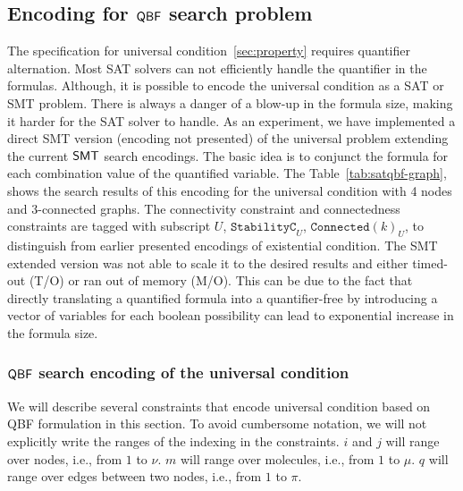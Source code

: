 \subsection{Encoding for $\mathsf{QBF}$ search problem}\label{enc:univ-cond}
%

\noindent The specification for universal condition~\ref{sec:property} requires quantifier alternation. 
%
Most SAT solvers can not efficiently handle the quantifier in the formulas. 
% 
Although, it is possible to encode the universal condition as a SAT or SMT problem.
%
There is always a danger of a blow-up in the formula size, making it harder for the SAT solver to handle. 
% 
As an experiment, we have implemented a direct SMT version (encoding not presented) of the universal problem extending the current $\mathsf{SMT}$ search encodings.
%
The basic idea is to conjunct the formula for each combination value of the quantified variable. 
%
The Table~\ref{tab:satqbf-graph}, shows the search results of this encoding for the universal condition with 4 nodes and 3-connected graphs. 
%
The connectivity constraint and connectedness constraints are tagged with subscript $U$, $\texttt{StabilityC}_{U}$, $\texttt{Connected}(k)_{U}$,  to distinguish from earlier presented encodings of existential condition.
%
The SMT extended version was not able to scale it to the desired results and either timed-out (T/O) or ran out of memory (M/O).
%
This can be due to the fact that directly translating a quantified formula into a quantifier-free by introducing a vector of variables for each boolean possibility can lead to exponential increase in the formula size.
%
%
\subsubsection{$\mathsf{QBF}$ search encoding of the universal condition}
We will describe several constraints that encode universal condition based on QBF formulation in this section.
%
To avoid cumbersome notation, we will not explicitly write the ranges
of the indexing in the constraints.
%
$i$ and $j$ will range over nodes, i.e., from $1$ to $\nu$.
%
$m$ will range over molecules, i.e., from $1$ to $\mu$.
%
$q$ will range over edges between two nodes, i.e., from $1$ to $\pi$.
%

